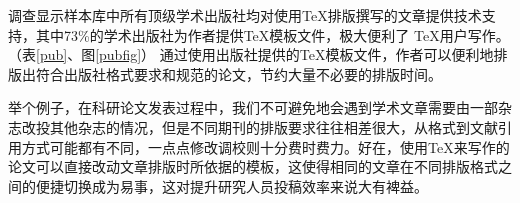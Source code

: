 调查显示样本库中所有顶级学术出版社均对使用\TeX 排版撰写的文章提供技术支持，其中73\%的学术出版社为作者提供\TeX 模板文件，极大便利了 \TeX 用户写作。（表\ref{pub}、图\ref{pubfig}）
通过使用出版社提供的\TeX 模板文件，作者可以便利地排版出符合出版社格式要求和规范的论文，节约大量不必要的排版时间。

举个例子，在科研论文发表过程中，我们不可避免地会遇到学术文章需要由一部杂志改投其他杂志的情况，但是不同期刊的排版要求往往相差很大，从格式到文献引用方式可能都有不同，一点点修改调校则十分费时费力。好在，使用\TeX 来写作的论文可以直接改动文章排版时所依据的模板，这使得相同的文章在不同排版格式之间的便捷切换成为易事，这对提升研究人员投稿效率来说大有裨益。